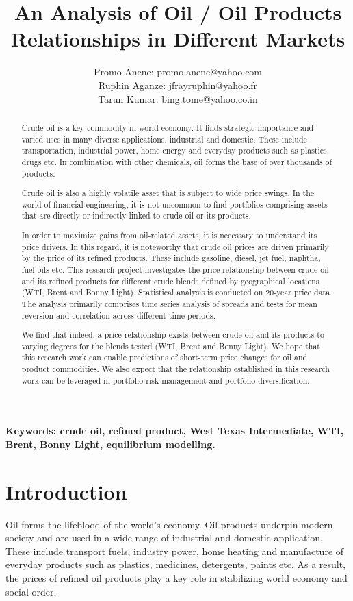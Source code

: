 \documentclass[a4paper,10pt]{article}
\title{An Analysis of Oil / Oil Products Relationships in Different Markets}
\author{Promo Anene: promo.anene@yahoo.com \\
        Ruphin Aganze: jfrayruphin@yahoo.fr \\
        Tarun Kumar: bing.tome@yahoo.co.in \\}
\begin{document}
\maketitle

\medskip
\begin{abstract}
    \it{Crude oil is a key commodity in world economy. It finds strategic importance and varied uses in many diverse applications, industrial and domestic. These include transportation, industrial power, home energy and everyday products such as plastics, drugs etc. In combination with other chemicals, oil forms the base of over thousands of products.


    Crude oil is also a highly volatile asset that is subject to wide price swings. In the world of financial engineering, it is not uncommon to find portfolios comprising assets that are directly or indirectly linked to crude oil or its products.


    In order to maximize gains from oil-related assets, it is necessary to understand its price drivers. In this regard, it is noteworthy that crude oil prices are driven primarily by the price of its refined products. These include gasoline, diesel, jet fuel, naphtha, fuel oils etc. This research project investigates the price relationship between crude oil and its refined products for different crude blends defined by geographical locations (WTI, Brent and Bonny Light). Statistical analysis is conducted on 20-year price data. The analysis primarily comprises time series analysis of spreads and tests for mean reversion and correlation across different time periods.

    We find that indeed, a price relationship exists between crude oil and its products to varying degrees for the blends tested (WTI, Brent and Bonny Light). We hope that this research work can enable predictions of short-term price changes for oil and product commodities. We also expect that the relationship established in this research work can be leveraged in portfolio risk management and portfolio diversification.}
\end{abstract}

\textbf{Keywords: crude oil, refined product, West Texas Intermediate, WTI, Brent, Bonny Light, equilibrium modelling.}
\section{Introduction}
Oil forms the lifeblood of the world’s economy. Oil products underpin modern society and are used in a wide range of industrial and domestic application. These include transport fuels, industry power, home heating and manufacture of everyday products such as plastics, medicines, detergents, paints etc. As a result, the prices of refined oil products play a key role in stabilizing world economy and social order.\newline
\end{document}
